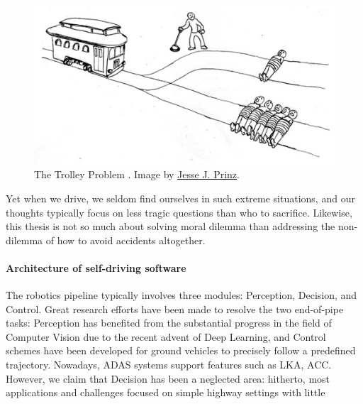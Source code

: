 \begin{figure}[tp]
	\centering
	\includegraphics[width=0.7\linewidth]{img/trolley}
	\caption{The Trolley Problem \citep{Foot1967}. Image by \href{http://subcortex.com/}{Jesse J. Prinz}.}
	\label{fig:trolley}
\end{figure}

Yet when we drive, we seldom find ourselves in such extreme situations, and our thoughts typically focus on less tragic questions than who to sacrifice.
Likewise, this thesis is not so much about solving moral dilemma than addressing the non-dilemma of how to avoid accidents altogether.%

\paragraph{Architecture of self-driving software}

The robotics pipeline typically involves three modules: Perception, Decision, and Control.
Great research efforts have been made to resolve the two end-of-pipe tasks: Perception has benefited from the substantial progress in the field of Computer Vision due to the recent advent of Deep Learning, and Control schemes have been developed for ground vehicles to precisely follow a predefined trajectory. Nowadays, ADAS systems support features such as LKA, ACC. However, we claim that Decision has been a neglected area: hitherto, most applications and challenges focused on simple highway settings with little 


